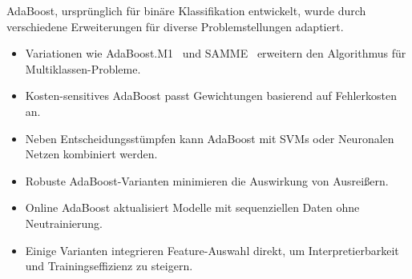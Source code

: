 AdaBoost, ursprünglich für binäre Klassifikation entwickelt,
wurde durch verschiedene Erweiterungen für diverse Problemstellungen adaptiert.

\begin{itemize}
    \item Variationen wie \glqq AdaBoost.M1\grqq~ und \glqq SAMME\grqq~ erweitern den Algorithmus für Multiklassen-Probleme.
    \item Kosten-sensitives AdaBoost passt Gewichtungen basierend auf Fehlerkosten an.
    \item Neben Entscheidungsstümpfen kann AdaBoost mit SVMs oder Neuronalen Netzen kombiniert werden.
    \item Robuste AdaBoost-Varianten minimieren die Auswirkung von Ausreißern.
    \item Online AdaBoost aktualisiert Modelle mit sequenziellen Daten ohne Neutrainierung.
    \item Einige Varianten integrieren Feature-Auswahl direkt, um Interpretierbarkeit und Trainingseffizienz zu steigern.
\end{itemize}